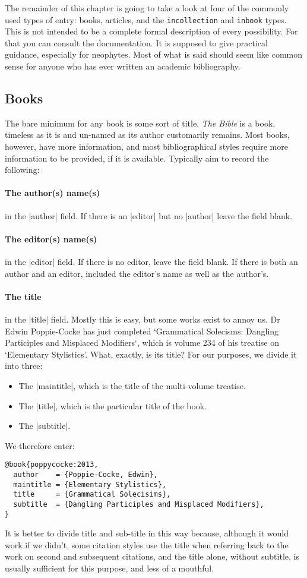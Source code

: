 {The remainder of this chapter is going to take a look at four of the commonly used types of entry: books, articles, and the \verb|incollection| and \verb|inbook| types. This is not intended to be a complete formal description of every possibility. For that you can consult the documentation. It is supposed to give practical guidance, especially for neophytes. Most of what is said should seem like common sense for anyone who has ever written an academic bibliography.

\subsection{Books}

The bare minimum for any book is some sort of title. \emph{The Bible} is a book, timeless as it is and un-named as its author customarily remains. Most books, however, have more information, and most bibliographical styles require more information to be provided, if it is available. Typically aim to record the following:

\paragraph{The author(s) name(s)} in the |author| field. If there is an |editor| but no |author| leave the field blank.

\paragraph{The editor(s) name(s)} in the |editor| field. If there is no editor, leave the field blank. If there is both an author and an editor, included the editor's name as well as the author's.

\paragraph{The title} in the |title| field. Mostly this is easy, but some works exist to annoy us. Dr Edwin Poppie-Cocke has just completed `Grammatical Solecisms: Dangling Participles and Misplaced Modifiers`, which is volume 234 of his treatise on `Elementary Stylistics'. What, exactly, is its title? For our purposes, we divide it into three:
\begin{itemize}
\item The |maintitle|, which is the title of the multi-volume treatise.
\item The |title|, which is the particular title of the book.
\item The |subtitle|.
\end{itemize}
We therefore enter:
\begin{verbatim}
@book{poppycocke:2013,
  author    = {Poppie-Cocke, Edwin},
  maintitle = {Elementary Stylistics},
  title     = {Grammatical Solecisims},
  subtitle  = {Dangling Participles and Misplaced Modifiers},
}
\end{verbatim}
It is better to divide title and sub-title in this way because, although it would work if we didn't, some citation styles use the title when referring back to the work on second and subsequent citations, and the title alone, without subtitle, is usually sufficient for this purpose, and less of a mouthful.

}

